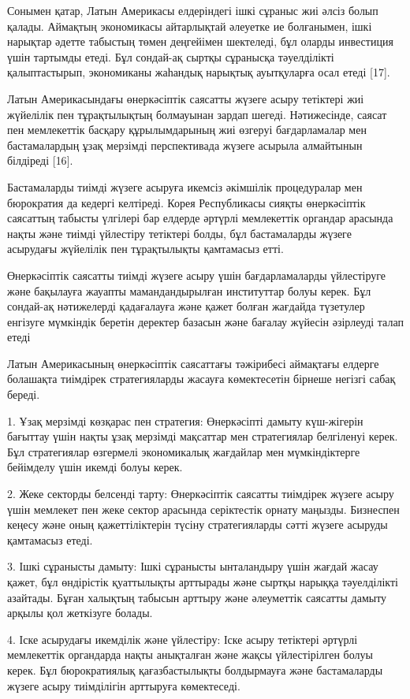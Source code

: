 \begin{multicols}{2}
Сонымен қатар, Латын Америкасы елдеріндегі ішкі сұраныс жиі әлсіз болып
қалады. Аймақтың экономикасы айтарлықтай әлеуетке ие болғанымен, ішкі
нарықтар әдетте табыстың төмен деңгейімен шектеледі, бұл оларды
инвестиция үшін тартымды етеді. Бұл сондай-ақ сыртқы сұранысқа
тәуелділікті қалыптастырып, экономиканы жаһандық нарықтық ауытқуларға
осал етеді {[}17{]}.

Латын Америкасындағы өнеркәсіптік саясатты жүзеге асыру тетіктері жиі
жүйелілік пен тұрақтылықтың болмауынан зардап шегеді. Нәтижесінде,
саясат пен мемлекеттік басқару құрылымдарының жиі өзгеруі бағдарламалар
мен бастамалардың ұзақ мерзімді перспективада жүзеге асырыла алмайтынын
білдіреді {[}16{]}.

Бастамаларды тиімді жүзеге асыруға икемсіз әкімшілік процедуралар мен
бюрократия да кедергі келтіреді. Корея Республикасы сияқты өнеркәсіптік
саясаттың табысты үлгілері бар елдерде әртүрлі мемлекеттік органдар
арасында нақты және тиімді үйлестіру тетіктері болды, бұл бастамаларды
жүзеге асырудағы жүйелілік пен тұрақтылықты қамтамасыз етті.

Өнеркәсіптік саясатты тиімді жүзеге асыру үшін бағдарламаларды
үйлестіруге және бақылауға жауапты мамандандырылған институттар болуы
керек. Бұл сондай-ақ нәтижелерді қадағалауға және қажет болған жағдайда
түзетулер енгізуге мүмкіндік беретін деректер базасын және бағалау
жүйесін әзірлеуді талап етеді

Латын Америкасының өнеркәсіптік саясаттағы тәжірибесі аймақтағы елдерге
болашақта тиімдірек стратегияларды жасауға көмектесетін бірнеше негізгі
сабақ береді.

1. Ұзақ мерзімді көзқарас пен стратегия: Өнеркәсіпті дамыту күш-жігерін
бағыттау үшін нақты ұзақ мерзімді мақсаттар мен стратегиялар белгіленуі
керек. Бұл стратегиялар өзгермелі экономикалық жағдайлар мен
мүмкіндіктерге бейімделу үшін икемді болуы керек.

2. Жеке секторды белсенді тарту: Өнеркәсіптік саясатты тиімдірек жүзеге
асыру үшін мемлекет пен жеке сектор арасында серіктестік орнату маңызды.
Бизнеспен кеңесу және оның қажеттіліктерін түсіну стратегияларды сәтті
жүзеге асыруды қамтамасыз етеді.

3. Ішкі сұранысты дамыту: Ішкі сұранысты ынталандыру үшін жағдай жасау
қажет, бұл өндірістік қуаттылықты арттырады және сыртқы нарыққа
тәуелділікті азайтады. Бұған халықтың табысын арттыру және әлеуметтік
саясатты дамыту арқылы қол жеткізуге болады.

4. Іске асырудағы икемділік және үйлестіру: Іске асыру тетіктері әртүрлі
мемлекеттік органдарда нақты анықталған және жақсы үйлестірілген болуы
керек. Бұл бюрократиялық қағазбастылықты болдырмауға және бастамаларды
жүзеге асыру тиімділігін арттыруға көмектеседі.


\end{multicols}
